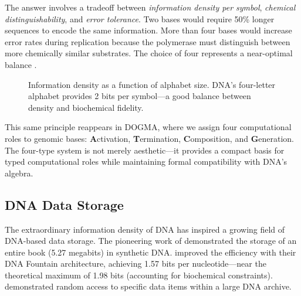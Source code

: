 The answer involves a tradeoff between \emph{information density per symbol}, \emph{chemical distinguishability}, and \emph{error tolerance}. Two bases would require 50\% longer sequences to encode the same information. More than four bases would increase error rates during replication because the polymerase must distinguish between more chemically similar substrates. The choice of four represents a near-optimal balance \citep{alberts2022}.

\begin{figure}[H]
\centering
{}
\caption{Information density as a function of alphabet size. DNA's four-letter alphabet provides 2 bits per symbol---a good balance between density and biochemical fidelity.}
\label{fig:alphabet-tradeoff}
\end{figure}

This same principle reappears in DOGMA, where we assign four computational roles to genomic bases: \textbf{A}ctivation, \textbf{T}ermination, \textbf{C}omposition, and \textbf{G}eneration. The four-type system is not merely aesthetic---it provides a compact basis for typed computational roles while maintaining formal compatibility with DNA's algebra.

\subsection{DNA Data Storage}

The extraordinary information density of DNA has inspired a growing field of DNA-based data storage. The pioneering work of \citet{church2012} demonstrated the storage of an entire book (5.27 megabits) in synthetic DNA. \citet{erlich2017} improved the efficiency with their DNA Fountain architecture, achieving 1.57 bits per nucleotide---near the theoretical maximum of 1.98 bits (accounting for biochemical constraints). \citet{organick2018} demonstrated random access to specific data items within a large DNA archive.

